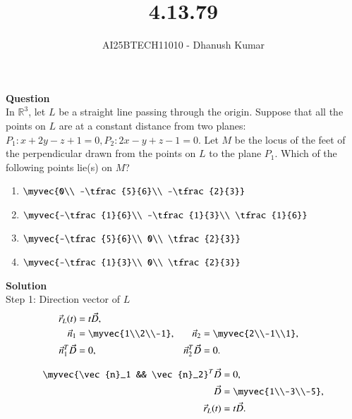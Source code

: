 \documentclass[journal]{IEEEtran}
\begin{document}
\title{4.13.79}
\author{AI25BTECH11010 - Dhanush Kumar}
\maketitle
\renewcommand{\thefigure}{\theenumi}
\renewcommand{\thetable}{\theenumi}

\textbf{Question}\\

In $\mathbb{R}^3$, let $L$ be a straight line passing through the origin. Suppose that all the points on $L$ are at a constant distance from two planes:$
P_1 : x+2y-z+1=0, 
P_2 : 2x-y+z-1=0.$
Let $M$ be the locus of the feet of the perpendicular drawn from the points on $L$ to the plane $P_1$. Which of the following points lie(s) on $M$?

\begin{enumerate}
\item $\myvec{0\\ -\tfrac{5}{6}\\ -\tfrac{2}{3}}$
\item $\myvec{-\tfrac{1}{6}\\ -\tfrac{1}{3}\\ \tfrac{1}{6}}$
\item $\myvec{-\tfrac{5}{6}\\ 0\\ \tfrac{2}{3}}$
\item $\myvec{-\tfrac{1}{3}\\ 0\\ \tfrac{2}{3}}$
\end{enumerate}

\textbf{Solution}\\

Step 1: Direction vector of $L$
\begin{align}
\vec{r}_L(t) &= t \vec{D}, \\
\vec{n}_1 &= \myvec{1\\2\\-1}, & \vec{n}_2 &= \myvec{2\\-1\\1}, \\
\vec{n}_1^T \vec{D} &= 0, & \vec{n}_2^T \vec{D} &= 0.
\end{align}

\begin{align}
	\myvec{\vec{n}_1 && \vec{n}_2}^T \vec{D} &= 0, \\
\vec{D} &= \myvec{1\\-3\\-5}, \\
\vec{r}_L(t) &= t \vec{D}.
\end{align}
\end{document}
